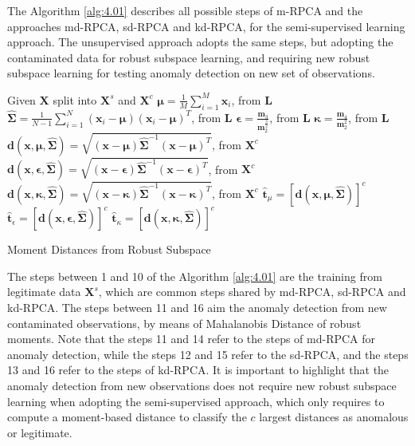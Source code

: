 \documentclass[review]{elsarticle}
\begin{document}
The Algorithm \ref{alg:4.01} describes all possible steps of m-RPCA and the approaches md-RPCA, sd-RPCA and kd-RPCA, for the semi-supervised learning approach. The unsupervised approach adopts the same steps, but adopting the contaminated data for robust subspace learning, and requiring new robust subspace learning for testing anomaly detection on new set of observations.

\begin{algorithm}
	\label{alg:4.01}
	\SetAlgoLined
	Given $\pmb{X}$ split into $\pmb{X}^s$ and $\pmb{X}^c$\;
	$\pmb{\mu} = \displaystyle\frac{1}{M}\displaystyle\sum_{i = 1}^{M} \pmb{x}_i$, from $\pmb{L}$\;
	$\hat{\pmb{\Sigma}} = \displaystyle\frac{1}{N-1}\displaystyle\sum_{i = 1}^{N} (\pmb{x}_i - \pmb{\mu})(\pmb{x}_i - \pmb{\mu})^T$, \rm from $\pmb{L}$\;
	$\pmb{\epsilon} = \frac{\pmb{m}_3}{\pmb{m}_2^{\frac{3}{2}}}$, \rm from $\pmb{L}$\;
	$\pmb{\kappa} = \frac{\pmb{m}_4}{\pmb{m}_2^2}$, \rm from $\pmb{L}$\;
	$\pmb{d}(\pmb{x}, \pmb{\mu}, \hat{\pmb{\Sigma}}) = \sqrt{(\pmb{x} - \pmb{\mu}) \hat{\pmb{\Sigma}}^{-1}(\pmb{x} - \pmb{\mu})^T}$, \rm from $\pmb{X}^c$\;
	$\pmb{d}(\pmb{x}, \pmb{\epsilon}, \hat{\pmb{\Sigma}}) = \sqrt{(\pmb{x} - \pmb{\epsilon}) \hat{\pmb{\Sigma}}^{-1}(\pmb{x} - \pmb{\epsilon})^T}$, \rm from $\pmb{X}^c$\;
	$\pmb{d}(\pmb{x}, \pmb{\kappa}, \hat{\pmb{\Sigma}}) = \sqrt{(\pmb{x} - \pmb{\kappa}) \hat{\pmb{\Sigma}}^{-1}(\pmb{x} - \pmb{\kappa})^T}$, \rm from $\pmb{X}^c$\;
	$\hat{\pmb{t}}_{\mu} = [\pmb{d}(\pmb{x}, \pmb{\mu}, \hat{\pmb{\Sigma}})]^c$\;
	$\hat{\pmb{t}}_{\epsilon} = [\pmb{d}(\pmb{x}, \pmb{\epsilon}, \hat{\pmb{\Sigma}})]^c$\;
	$\hat{\pmb{t}}_{\kappa} = [\pmb{d}(\pmb{x}, \pmb{\kappa}, \hat{\pmb{\Sigma}})]^c$\;
	\caption{Moment Distances from Robust Subspace}
\end{algorithm}

The steps between 1 and 10 of the Algorithm \ref{alg:4.01} are the training from legitimate data $\pmb{X}^s$, which are common steps shared by md-RPCA, sd-RPCA and kd-RPCA. The steps between 11 and 16 aim the anomaly detection from new contaminated observations, by means of Mahalanobis Distance of robust moments. Note that the steps 11 and 14 refer to the steps of md-RPCA for anomaly detection, while the steps 12 and 15 refer to the sd-RPCA, and the steps 13 and 16 refer to the steps of kd-RPCA. It is important to highlight that the anomaly detection from new observations does not require new robust subspace learning when adopting the semi-supervised approach, which only requires to compute a moment-based distance to classify the $c$ largest distances as anomalous or legitimate.
\end{document}
